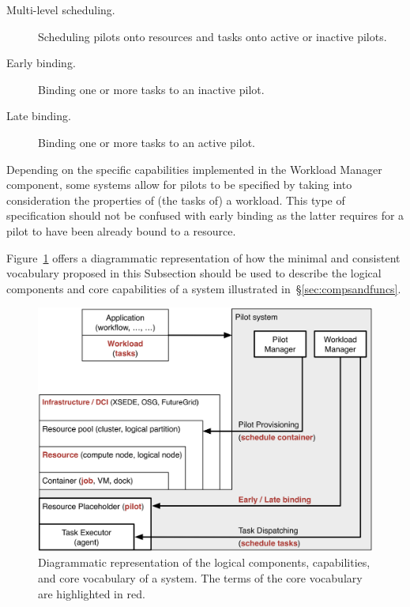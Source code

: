\documentclass{sig-alternate}
\begin{document}
\begin{description}

\item[Multi-level scheduling.] Scheduling pilots onto resources and tasks onto
active or inactive pilots.

\item[Early binding.] Binding one or more tasks to an inactive pilot.

\item[Late binding.] Binding one or more tasks to an active pilot.

\end{description}

Depending on the specific capabilities implemented in the Workload
Manager component, some \pilot systems allow for pilots to be
specified by taking into consideration the properties of (the tasks of) a
workload. This type of specification should not be confused with early
binding as the latter requires for a pilot to have been already
bound to a resource.

Figure~\ref{fig:core_vocabulary} offers a diagrammatic representation of
how the minimal and consistent vocabulary proposed in this Subsection
should be used to describe the logical components and core capabilities
of a \pilot system illustrated in~\S\ref{sec:compsandfuncs}.

\begin{figure}[t]
    \centering
        \includegraphics[width=.48\textwidth]{figures/core_vocabulary.png}
    \caption{Diagrammatic representation of the logical components,
             capabilities, and core vocabulary of a \pilot system.
             The terms of the core vocabulary are highlighted in red.}
    \label{fig:core_vocabulary}
\end{figure}

\end{document}
